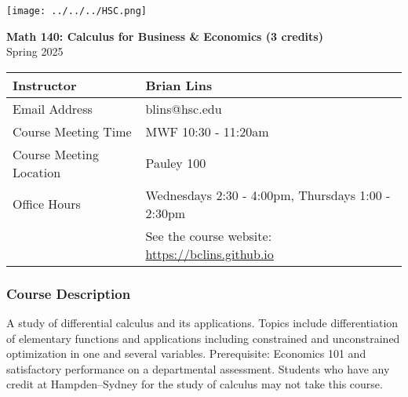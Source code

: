 \documentclass[10pt]{article}
\begin{document}
\noindent
%


\begin{center}
\texttt{[image: ../../../HSC.png]} 
\bigskip

\textbf{Math 140: Calculus for Business \& Economics (3 credits)} \\
Spring 2025
\end{center}

\noindent
\begin{tabular}{|l|l|}
\hline
Instructor & Brian Lins \\ \hline
Email Address & blins@hsc.edu \\ \hline
Course Meeting Time & MWF 10:30 - 11:20am \\ \hline
Course Meeting Location & Pauley 100 \\ \hline
Office Hours & Wednesdays 2:30 - 4:00pm, Thursdays 1:00 - 2:30pm \\ 
& See the course website: \url{https://bclins.github.io} ~ \\ \hline
\end{tabular}

\subsubsection*{Course Description}

A study of differential calculus and its applications. Topics include differentiation of elementary functions and applications including constrained and unconstrained optimization in one and several variables. Prerequisite: Economics 101 and satisfactory performance on a departmental assessment. Students who have any credit at Hampden–Sydney for the study of calculus may not take this course.
\end{document}
